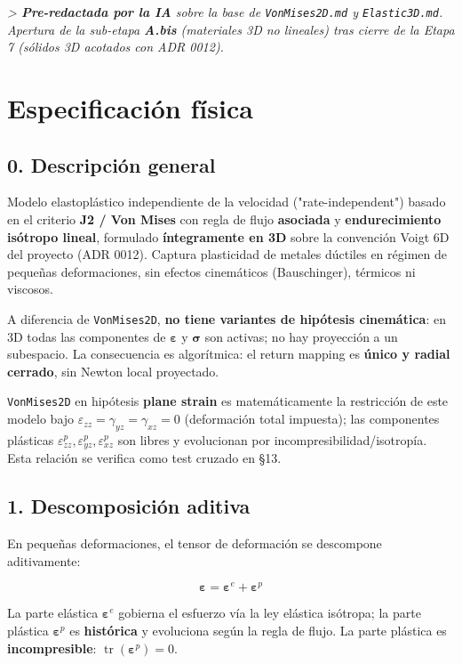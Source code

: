 \documentclass[11pt,letterpaper,oneside]{report}
\begin{document}
\textit{> \textbf{Pre-redactada por la IA} sobre la base de \texttt{VonMises2D.md} y \texttt{Elastic3D.md}. Apertura de la sub-etapa \textbf{A.bis} (materiales 3D no lineales) tras cierre de la Etapa 7 (sólidos 3D acotados con ADR 0012).}



\section{Especificación física}

\subsection{0. Descripción general}

Modelo elastoplástico independiente de la velocidad ("rate-independent") basado en el criterio \textbf{J2 / Von Mises} con regla de flujo \textbf{asociada} y \textbf{endurecimiento isótropo lineal}, formulado \textbf{íntegramente en 3D} sobre la convención Voigt 6D del proyecto (ADR 0012). Captura plasticidad de metales dúctiles en régimen de pequeñas deformaciones, sin efectos cinemáticos (Bauschinger), térmicos ni viscosos.

A diferencia de \texttt{VonMises2D}, \textbf{no tiene variantes de hipótesis cinemática}: en 3D todas las componentes de $\boldsymbol\varepsilon$ y $\boldsymbol\sigma$ son activas; no hay proyección a un subespacio. La consecuencia es algorítmica: el return mapping es \textbf{único y radial cerrado}, sin Newton local proyectado.

\texttt{VonMises2D} en hipótesis \textbf{plane strain} es matemáticamente la restricción de este modelo bajo $\varepsilon_{zz} = \gamma_{yz} = \gamma_{xz} = 0$ (deformación total impuesta); las componentes plásticas $\varepsilon^p_{zz}, \varepsilon^p_{yz}, \varepsilon^p_{xz}$ son libres y evolucionan por incompresibilidad/isotropía. Esta relación se verifica como test cruzado en §13.

\subsection{1. Descomposición aditiva}

En pequeñas deformaciones, el tensor de deformación se descompone aditivamente:

\[
\boldsymbol\varepsilon = \boldsymbol\varepsilon^e + \boldsymbol\varepsilon^p
\]

La parte elástica $\boldsymbol\varepsilon^e$ gobierna el esfuerzo vía la ley elástica isótropa; la parte plástica $\boldsymbol\varepsilon^p$ es \textbf{histórica} y evoluciona según la regla de flujo. La parte plástica es \textbf{incompresible}: $\operatorname{tr}(\boldsymbol\varepsilon^p) = 0$.
\end{document}
